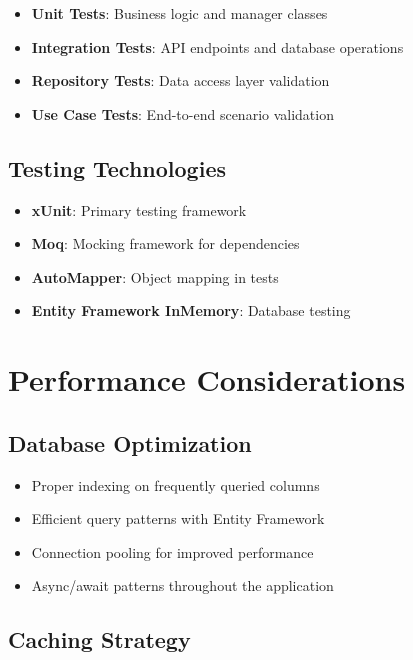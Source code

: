 \documentclass[12pt,a4paper]{article}
\begin{document}
\begin{itemize}
    \item \textbf{Unit Tests}: Business logic and manager classes
    \item \textbf{Integration Tests}: API endpoints and database operations
    \item \textbf{Repository Tests}: Data access layer validation
    \item \textbf{Use Case Tests}: End-to-end scenario validation
\end{itemize}

\subsection{Testing Technologies}

\begin{itemize}
    \item \textbf{xUnit}: Primary testing framework
    \item \textbf{Moq}: Mocking framework for dependencies
    \item \textbf{AutoMapper}: Object mapping in tests
    \item \textbf{Entity Framework InMemory}: Database testing
\end{itemize}

\section{Performance Considerations}

\subsection{Database Optimization}

\begin{itemize}
    \item Proper indexing on frequently queried columns
    \item Efficient query patterns with Entity Framework
    \item Connection pooling for improved performance
    \item Async/await patterns throughout the application
\end{itemize}

\subsection{Caching Strategy}
\end{document}
